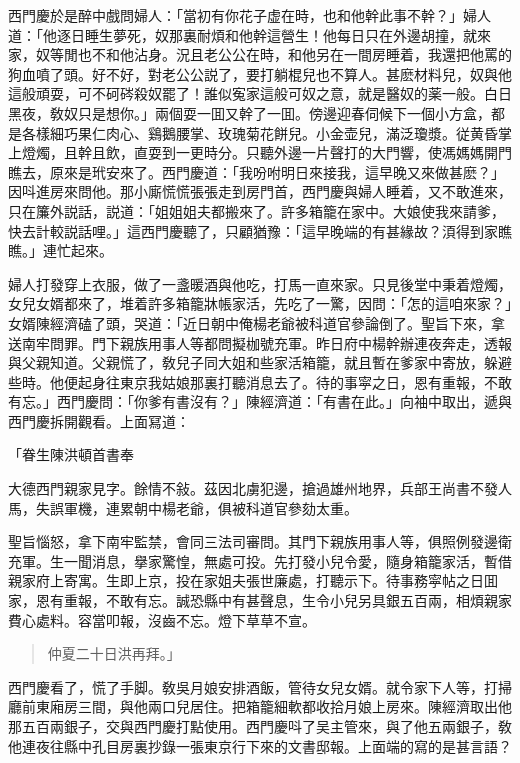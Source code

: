 西門慶於是醉中戲問婦人：「當初有你花子虚在時，也和他幹此事不幹？」婦人道：「他逐日睡生夢死，奴那裏耐煩和他幹這營生！他每日只在外邊胡撞，就來家，奴等閒也不和他沾身。況且老公公在時，和他另在一間房睡着，我還把他罵的狗血噴了頭。好不好，對老公公説了，要打躺棍兒也不算人。甚麽材料兒，奴與他這般頑耍，可不砢硶殺奴罷了！誰似寃家這般可奴之意，就是醫奴的薬一般。白日黑夜，敎奴只是想你。」兩個耍一囬又幹了一囬。傍邊迎春伺候下一個小方盒，都是各樣細巧果仁肉心、鷄鵝腰掌、玫瑰菊花餅兒。小金壶兒，滿泛瓊漿。従黄昏掌上燈燭，且幹且飲，直耍到一更時分。只聽外邊一片聲打的大門響，使馮媽媽開門瞧去，原來是玳安來了。西門慶道：「我吩咐明日來接我，這早晚又來做甚麽？」因呌進房來問他。那小廝慌慌張張走到房門首，西門慶與婦人睡着，又不敢進來，只在簾外説話，説道：「姐姐姐夫都搬來了。許多箱籠在家中。大娘使我來請爹，快去計較説話哩。」這西門慶聽了，只顧猶豫：「這早晚端的有甚緣故？湏得到家瞧瞧。」連忙起來。

婦人打發穿上衣服，做了一盞暖酒與他吃，打馬一直來家。只見後堂中秉着燈燭，女兒女婿都來了，堆着許多箱籠牀帳家活，先吃了一驚，因問：「怎的這咱來家？」女婿陳經濟磕了頭，哭道：「近日朝中俺楊老爺被科道官參論倒了。聖旨下來，拿送南牢問罪。門下親族用事人等都問擬枷號充軍。昨日府中楊幹辦連夜奔走，透報與父親知道。父親慌了，敎兒子同大姐和些家活箱籠，就且暫在爹家中寄放，躲避些時。他便起身往東京我姑娘那裏打聽消息去了。待的事寜之日，恩有重報，不敢有忘。」西門慶問：「你爹有書沒有？」陳經濟道：「有書在此。」向袖中取出，遞與西門慶拆開觀看。上面冩道：

\begin{myquote}
「眷生陳洪頓首書奉

大德西門親家見字。餘情不敍。茲因北虜犯邊，搶過雄州地界，兵部王尚書不發人馬，失誤軍機，連累朝中楊老爺，俱被科道官參劾太重。

聖旨惱怒，拿下南牢監禁，會同三法司審問。其門下親族用事人等，俱照例發邊衛充軍。生一聞消息，擧家驚惶，無處可投。先打發小兒令愛，隨身箱籠家活，暫借親家府上寄寓。生即上京，投在家姐夫張世廉處，打聽示下。待事務寜帖之日囬家，恩有重報，不敢有忘。誠恐縣中有甚聲息，生令小兒另具銀五百兩，相煩親家費心處料。容當叩報，沒齒不忘。燈下草草不宣。
\end{myquote}

\begin{quotation}\begin{flushright}
仲夏二十日洪再拜。」
\end{flushright}\end{quotation}

西門慶看了，慌了手脚。敎吳月娘安排酒飯，管待女兒女婿。就令家下人等，打掃廳前東廂房三間，與他兩口兒居住。把箱籠細軟都收拾月娘上房來。陳經濟取出他那五百兩銀子，交與西門慶打點使用。西門慶呌了吴主管來，與了他五兩銀子，敎他連夜往縣中孔目房裏抄錄一張東京行下來的文書邸報。上面端的寫的是甚言語？


